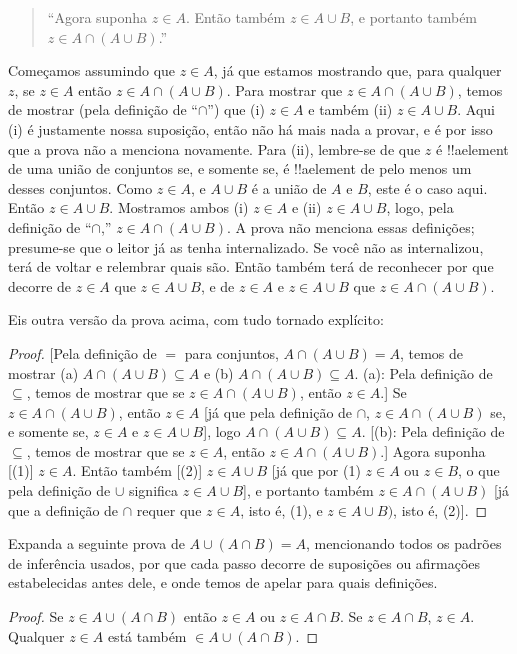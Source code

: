 \documentclass[../../../include/open-logic-section]{subfiles}
\begin{document}
\begin{quote}
``Agora suponha $z \in A$. Então também $z \in A \cup B$, e
portanto também $z \in A \cap (A \cup B)$.''
\end{quote}

Começamos assumindo que $z \in A$, já que estamos mostrando que, para
qualquer~$z$, se $z \in A$ então $z \in A \cap (A \cup B)$.  Para mostrar
que $z \in A \cap (A \cup B)$, temos de mostrar (pela definição de
``$\cap$'') que (i) $z \in A$ e também (ii) $z \in A \cup B$. Aqui (i) é
justamente nossa suposição, então não há mais nada a provar, e é por isso
que a prova não a menciona novamente. Para (ii), lembre-se de que $z$ é
!!a{element} de uma união de conjuntos se, e somente se, é !!a{element}
de pelo menos um desses conjuntos. Como $z \in A$, e $A \cup B$ é a união
de $A$ e $B$, este é o caso aqui. Então $z \in A \cup B$. Mostramos
ambos (i) $z \in A$ e (ii) $z \in A \cup B$, logo, pela definição de
``$\cap$,'' $z \in A \cap (A \cup B)$.  A prova não menciona essas
definições; presume-se que o leitor já as tenha internalizado.  Se você
não as internalizou, terá de voltar e relembrar quais são. Então também
terá de reconhecer por que decorre de $z \in A$ que $z \in A \cup B$, e
de $z \in A$ e $z \in A \cup B$ que $z \in A \cap (A \cup B)$.

Eis outra versão da prova acima, com tudo tornado explícito:
\begin{proof}{}
[Pela definição de $=$ para conjuntos, $A \cap (A \cup B) = A$, temos
  de mostrar (a) $A \cap (A \cup B) \subseteq A$ e (b) $A \cap (A \cup B)
  \subseteq A$. (a): Pela definição de $\subseteq$, temos de mostrar
  que se $z \in A \cap (A \cup B)$, então $z \in A$.]  Se $z \in A
\cap (A \cup B)$, então $z \in A$ [já que pela definição de $\cap$, $z
  \in A \cap (A \cup B)$ se, e somente se, $z \in A$ e $z \in A \cup B$], logo $A
\cap (A \cup B) \subseteq A$. [(b): Pela definição de $\subseteq$,
  temos de mostrar que se $z \in A$, então $z \in A \cap (A \cup B)$.] Agora
suponha [(1)] $z \in A$. Então também [(2)] $z \in A \cup B$ [já que por
  (1) $z \in A$ ou $z \in B$, o que pela definição de $\cup$ significa $z
  \in A \cup B$], e portanto também $z \in A \cap (A \cup B)$ [já que
  a definição de $\cap$ requer que $z \in A$, isto é, (1), e $z
  \in A \cup B)$, isto é, (2)].
\end{proof}

\begin{prob}
Expanda a seguinte prova de $A \cup (A \cap B) = A$, mencionando todos
os padrões de inferência usados, por que cada passo decorre de
suposições ou afirmações estabelecidas antes dele, e onde temos de
apelar para quais definições.
\begin{proof}
  Se $z \in A \cup (A \cap B)$ então $z \in A$ ou $z \in A \cap B$. Se
  $z \in A \cap B$, $z \in A$. Qualquer $z \in A$ está também $\in A \cup (A
  \cap B)$.
\end{proof}
\end{prob}
\end{document}
